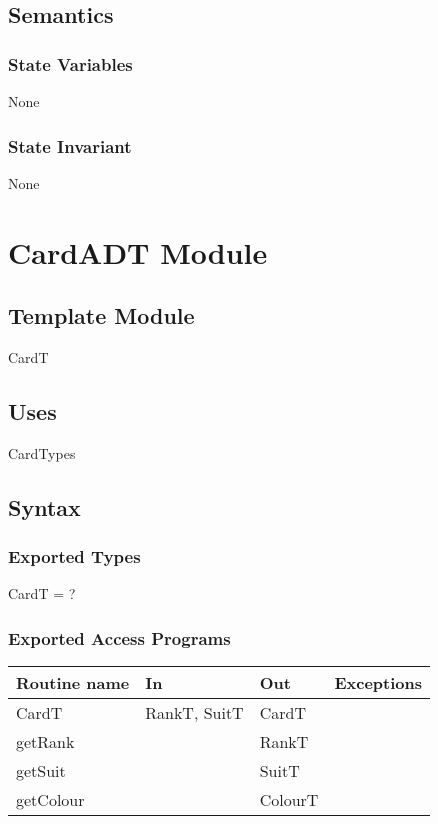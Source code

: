 \documentclass[12pt]{article}
\begin{document}
\subsection* {Semantics}

\subsubsection* {State Variables}

None

\subsubsection* {State Invariant}

None

\newpage

\section* {CardADT Module}

\subsection*{Template Module}

CardT

\subsection* {Uses}

CardTypes

\subsection* {Syntax}

\subsubsection* {Exported Types}

CardT = ?

\subsubsection* {Exported Access Programs}

\begin{tabular}{| l | l | l | l |}
\hline
\textbf{Routine name} & \textbf{In} & \textbf{Out} & \textbf{Exceptions}\\
\hline
CardT & RankT, SuitT & CardT &\\
\hline
getRank & & RankT&\\
\hline
getSuit & & SuitT&\\
\hline
getColour & & ColourT&\\
\hline
\end{tabular}
\end{document}
